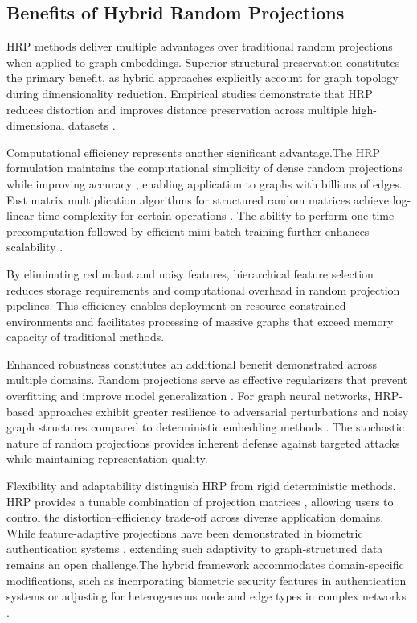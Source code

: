 \documentclass[conference]{IEEEtran}
\begin{document}
\subsection{Benefits of Hybrid Random Projections}

HRP methods deliver multiple advantages over traditional random projections when applied to graph embeddings. Superior structural preservation constitutes the primary benefit, as hybrid approaches explicitly account for graph topology during dimensionality reduction. Empirical studies demonstrate that HRP reduces distortion and improves distance preservation across multiple high-dimensional datasets \cite{yahaya2025hrp}.

Computational efficiency represents another significant advantage.The HRP formulation maintains the computational simplicity of dense random projections while improving accuracy \cite{yahaya2025hrp}, enabling application to graphs with billions of edges. Fast matrix multiplication algorithms for structured random matrices achieve log-linear time complexity for certain operations \cite{le2014fastfood}. The ability to perform one-time precomputation followed by efficient mini-batch training further enhances scalability \cite{hu2021rphgnn}.

By eliminating redundant and noisy features, hierarchical feature selection reduces storage requirements and computational overhead in random projection pipelines\cite{wang2019hierarchical}. This efficiency enables deployment on resource-constrained environments and facilitates processing of massive graphs that exceed memory capacity of traditional methods.

Enhanced robustness constitutes an additional benefit demonstrated across multiple domains. Random projections serve as effective regularizers that prevent overfitting and improve model generalization \cite{nguyen2016, cai2019enhanced}. For graph neural networks, HRP-based approaches exhibit greater resilience to adversarial perturbations and noisy graph structures compared to deterministic embedding methods \cite{nguyen2016}. The stochastic nature of random projections provides inherent defense against targeted attacks while maintaining representation quality.

Flexibility and adaptability distinguish HRP from rigid deterministic methods. HRP provides a tunable combination of projection matrices \cite{yahaya2025hrp}, allowing users to control the distortion–efficiency trade-off across diverse application domains. While feature-adaptive projections have been demonstrated in biometric authentication systems \cite{yang2021cancelable}, extending such adaptivity to graph-structured data remains an open challenge.The hybrid framework accommodates domain-specific modifications, such as incorporating biometric security features in authentication systems or adjusting for heterogeneous node and edge types in complex networks \cite{yang2021cancelable, hu2021rphgnn}.
\end{document}
